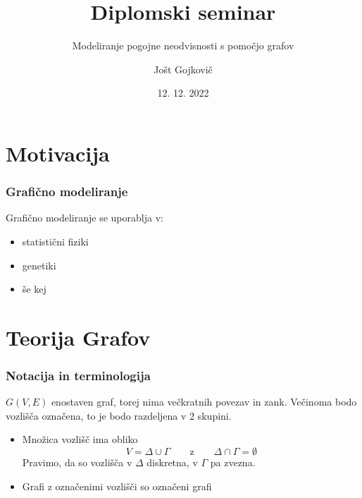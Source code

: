 \documentclass{beamer}
\title{Diplomski seminar}
\subtitle{Modeliranje pogojne neodvisnosti s pomočjo grafov}
\author{Jošt Gojkovič}
\institute[FMF] {Fakulteta za matematiko in fiziko}
\date{12. 12. 2022}
\begin{document}
\begin{frame}
    \titlepage         %
  \end{frame}
  

\section{Motivacija}

\begin{frame}
    \frametitle{Grafično modeliranje}
    Grafično modeliranje se uporablja v:
    \begin{itemize}
        \item statistični fiziki 
        \item genetiki 
        \item še kej 
    \end{itemize}
   
\end{frame}

\section{Teorija Grafov}

\begin{frame}
    \frametitle{Notacija in terminologija}
    $G(V,E)$ enostaven graf, torej nima večkratnih povezav in zank. Večinoma bodo 
    vozlišča označena, to je bodo razdeljena v 2 skupini.
    \begin{itemize}
        \item Množica vozlišč ima obliko 
        $$ V = \Delta \cup \Gamma \qquad \text{z} \qquad \Delta \cap  \Gamma = \emptyset  $$ 
        Pravimo, da so vozlišča v $\Delta$ diskretna, v $\Gamma$ pa zvezna.  
        \item Grafi z označenimi vozlišči so označeni grafi 
    \end{itemize}
\end{frame}
\end{document}
